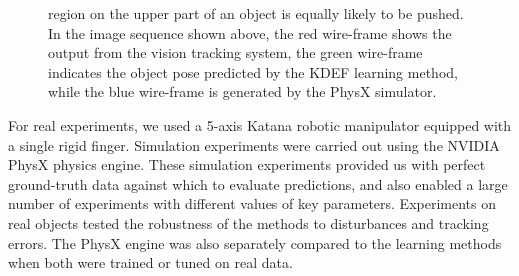 \begin{figure}[t]
{region on the upper part of an object is equally likely to be pushed.
In the image sequence shown above,
the red wire-frame shows the output from the vision tracking system,
the green wire-frame indicates the object pose predicted by the
KDEF learning method,
while the blue wire-frame is generated by the PhysX simulator.
}
\label{fig:Setup}
\end{figure}

For real experiments, we used a 5-axis Katana robotic manipulator
 equipped with a single rigid finger.
Simulation experiments were carried out using the NVIDIA PhysX physics
engine. These simulation experiments provided us
with perfect ground-truth data against which to evaluate predictions,
and also enabled a large number of experiments with different values
of key parameters. Experiments on real objects tested the robustness of
the methods to disturbances and tracking errors. The PhysX engine was
also separately compared to the learning methods when both were
trained or tuned on real data.


